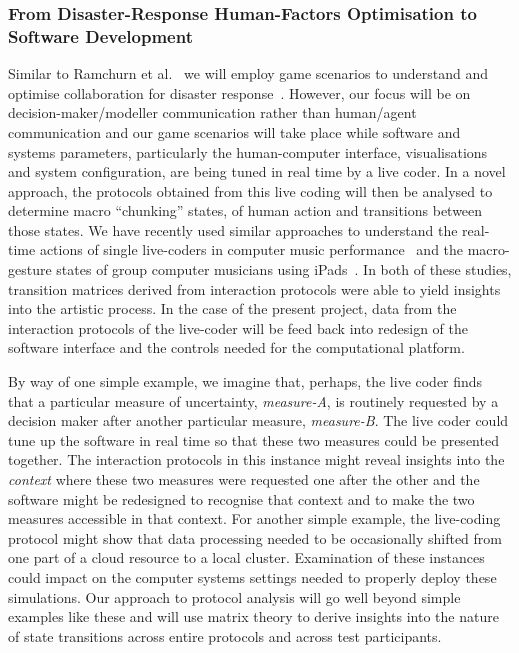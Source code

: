 \subsubsection*{From Disaster-Response Human-Factors Optimisation to Software Development}




Similar to Ramchurn et al.~\parencite{ramchurn2016human} 
we will employ game
scenarios to understand and optimise collaboration for disaster
response~\parencite{ramchurn2016human}. However, our focus will be on
decision-maker/modeller communication rather than human/agent
communication and our game scenarios will take place while software
and systems parameters, particularly the human-computer interface,
visualisations and system configuration, are being tuned in real time
by a live coder. In a novel approach, the protocols obtained from this
live coding will then be analysed to determine macro ``chunking''
states, of human action and transitions between those states. We have
recently used similar approaches to understand the real-time actions
of single live-coders in computer music
performance~\parencite{swift2014coding} and the macro-gesture states
of group computer musicians using
iPads~\parencite{martin2015tracking}. In both of these studies,
transition matrices derived from interaction protocols were able to
yield insights into the artistic process. In the case of the present
project, data from the interaction protocols of the live-coder will be
feed back into redesign of the software interface and the controls
needed for the computational platform.

By way of one simple example, we imagine that, perhaps, the live coder
finds that a particular measure of uncertainty, \emph{measure-A}, is
routinely requested by a decision maker after another particular
measure, \emph{measure-B}. The live coder could tune up the software
in real time so that these two measures could be presented together.
The interaction protocols in this instance might reveal insights into
the \emph{context} where these two measures were requested one after
the other and the software might be redesigned to recognise that
context and to make the two measures accessible in that context. For
another simple example, the live-coding protocol might show that data
processing needed to be occasionally shifted from one part of a cloud
resource to a local cluster. Examination of these instances could
impact on the computer systems settings needed to properly deploy
these simulations. Our approach to protocol analysis will go well
beyond simple examples like these and will use matrix theory to derive
insights into the nature of state transitions across entire protocols
and across test participants.

